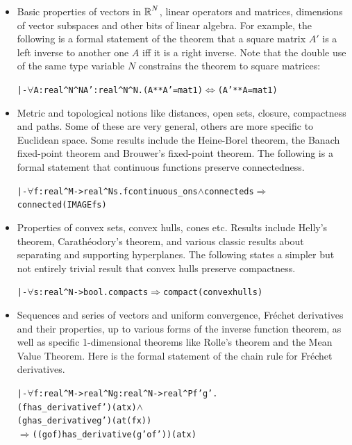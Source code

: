 \documentclass[11pt]{amsart}
\def\sz{small} %
\newcommand{\real}{\mbox{$\protect\mathbb R$}}
\let\And=\wedge                    %
\newcommand{\Imp}{\Rightarrow}
\newcommand{\Iff}{\Leftrightarrow}
\begin{document}
\begin{itemize}

\item Basic properties of vectors in $\real^N$, linear operators and matrices,
dimensions of vector subspaces and other bits of linear algebra. For example,
the following is a formal statement of the theorem that a square matrix $A'$ is
a left inverse to another one $A$ iff it is a right inverse. Note that the
double use of the same type variable $N$ constrains the theorem to square
matrices:

\begin{\sz}
\begin{alltt}
|- \(\forall\)A:real^N^N A':real^N^N. (A ** A' = mat 1) \(\Iff\) (A' ** A = mat 1)
\end{alltt}
\end{\sz}

\item Metric and topological notions like distances, open sets, closure,
compactness and paths. Some of these are very general, others are more specific
to Euclidean space. Some results include the Heine-Borel theorem, the Banach
fixed-point theorem and Brouwer's fixed-point theorem. The following is a
formal statement that continuous functions preserve connectedness.

\begin{\sz}
\begin{alltt}
|-  \(\forall\)f:real^M->real^N s. f continuous_on s \(\And\) connected s \(\Imp\) connected(IMAGE f s)
\end{alltt}
\end{\sz}

\item Properties of convex sets, convex hulls, cones etc. Results include
Helly's theorem, Carath\'eodory's theorem, and various classic results about
separating and supporting hyperplanes. The following states a simpler but not
entirely trivial result that convex hulls preserve compactness.

\begin{\sz}\begin{alltt}
|- \(\forall\)s:real^N->bool. compact s \(\Imp\) compact(convex hull s)
\end{alltt}\end{\sz}

\item Sequences and series of vectors and uniform convergence, Fr\'echet
derivatives and their properties, up to various forms of the inverse function
theorem, as well as specific 1-dimensional theorems like Rolle's theorem and
the Mean Value Theorem. Here is the formal statement of the chain rule for
Fr\'echet derivatives.

\begin{\sz}\begin{alltt}
|- \(\forall\)f:real^M->real^N g:real^N->real^P f' g'.
        (f has_derivative f') (at x) \(\And\)
        (g has_derivative g') (at (f x))
        \(\Imp\) ((g o f) has_derivative (g' o f')) (at x)
\end{alltt}\end{\sz}

\end{itemize}
\end{document}
